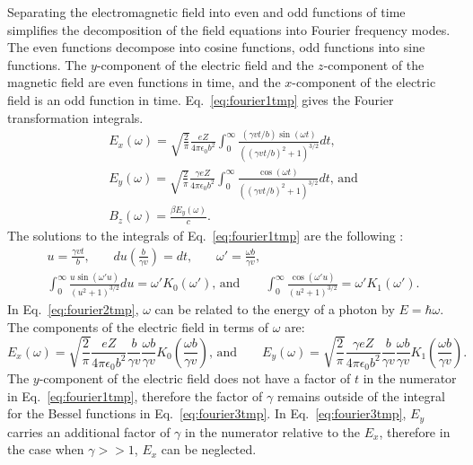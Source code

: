     Separating the electromagnetic field into even and odd functions of time 
      simplifies the decomposition of the field equations into Fourier frequency 
      modes.
    The even functions decompose into cosine functions, odd functions 
      into sine functions. 
    The $y$-component of the electric field and the $z$-component of 
      the magnetic field are even functions in time, and the 
      $x$-component of the electric field is an odd function in time.
    Eq.~\ref{eq:fourier1tmp} gives the Fourier transformation integrals. 
    \begin{eqnarray} \label{eq:fourier1tmp}
        E_{x}(\omega)=\sqrt{\frac{2}{\pi}}\frac{eZ}{4\pi\epsilon_{0}b^{2}}
         \int^{\infty}_{0}\frac{\left(\gamma vt/b\right)\sin
         \left(\omega t\right)}
         {\left(\left(\gamma vt/b\right)^{2}+1\right)^{3/2}}dt\textrm{,} \nonumber\\
          E_{y}(\omega)=\sqrt{\frac{2}{\pi}}\frac{\gamma eZ}
         {4\pi\epsilon_{0}b^{2}} \int^{\infty}_{0}\frac{\cos(\omega t)}
         {\left(\left(\gamma vt/b\right)^{2}+1\right)^{3/2}}dt\textrm{,  and}\\
          B_{z}(\omega)=\frac{\beta E_{y}(\omega)}{c}.\nonumber
    \end{eqnarray}
    The solutions to the integrals of Eq.~\ref{eq:fourier1tmp} are the following
      \cite{WWFermi}:
    \begin{eqnarray}  \label{eq:fourier2tmp}
      u=\frac{\gamma v t}{b}\textrm{,}\qquad du\left(\frac{b}{\gamma v}\right)=dt\textrm{,}\qquad
      \omega'=\frac{\omega b}{\gamma v}\textrm{,}\nonumber \\
      \int^{\infty}_{0}\frac{u \sin(\omega'u)}{\left(u^{2}+1\right)^{3/2}}du
      =\omega'K_{0}(\omega')\textrm{, and}\qquad
      \int^{\infty}_{0}\frac{\cos(\omega'u)}{\left(u^{2}+1\right)^{3/2}}
      =\omega'K_{1}(\omega').
    \end{eqnarray}
    In Eq.~\ref{eq:fourier2tmp}, $\omega$ can be related to the energy of a 
      photon by $E=\hbar\omega$.
    The components of the electric field in terms of $\omega$ are:
    \begin{equation} \label{eq:fourier3tmp}
        E_{x}(\omega)=\sqrt{\frac{2}{\pi}}\frac{eZ}{4\pi\epsilon_{0}b^{2}}
     \frac{b}{\gamma v}\frac{\omega b}{\gamma v}K_{0}
     \left(\frac{\omega b}{\gamma v}\right)\textrm{, and}\qquad
      E_{y}(\omega)=\sqrt{\frac{2}{\pi}}\frac{\gamma eZ}{4\pi\epsilon_{0}b^{2}}
     \frac{b}{\gamma v}\frac{\omega b}{\gamma v}K_{1}
     \left(\frac{\omega b}{\gamma v}\right).\qquad
    \end{equation}
    The $y$-component of the electric field does not have a factor of $t$ in 
      the numerator in Eq.~\ref{eq:fourier1tmp}, therefore the factor of $\gamma$ 
      remains outside of the integral for the Bessel functions in 
      Eq.~\ref{eq:fourier3tmp}.
    In Eq.~\ref{eq:fourier3tmp}, $E_{y}$ carries an additional factor of 
      $\gamma$ in the numerator relative to the $E_{x}$, therefore in the case
      when $\gamma >> 1$, $E_{x}$ can be neglected. 

